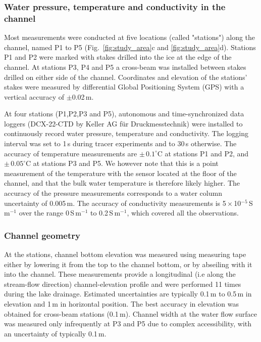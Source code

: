 \subsubsection{Water pressure, temperature and conductivity in the channel}

Most measurements were conducted at five locations (called "stations") along the channel, named P1 to P5 (Fig.~\ref{fig:study_area}c and \ref{fig:study_area}d). Stations P1 and P2 were marked with stakes drilled into the ice at the edge of the channel. At stations P3, P4 and P5 a cross-beam was installed between stakes drilled on either side of the channel.
Coordinates and elevation of the stations' stakes were measured by differential Global Positioning System (GPS) with a vertical accuracy of $\pm$0.02\,m.

At four stations (P1,P2,P3 and P5), autonomous and time-synchronized data loggers (DCX-22-CTD by Keller AG für Druckmesstechnik) were installed to continuously record water pressure, temperature and conductivity. The logging interval was set to 1\,s during tracer experiments and to 30\,s otherwise. The accuracy of temperature measurements are $\pm\,0.1^\circ$C at stations P1 and P2, and $\pm\,0.05^\circ$C at stations P3 and P5. We however note that this is a point measurement of the temperature with the sensor located at the floor of the channel, and that the bulk water temperature is therefore likely higher. The accuracy of the pressure measurements corresponds to a water column uncertainty of 0.005\,m. The accuracy of conductivity measurements is 5\,$\times$\,10$^{-5}$\,S\,m$^{-1}$ over the range 0\,S\,m$^{-1}$ to 0.2\,S\,m$^{-1}$, which covered all the observations.

\subsubsection{Channel geometry}
\label{subsubsection:channel_geometry}

At the stations, channel bottom elevation was measured using measuring tape either by lowering it from the top to the channel bottom, or by abseiling with it into the channel. These measurements provide a longitudinal (i.e along the stream-flow direction) channel-elevation profile and were performed 11 times during the lake drainage. Estimated uncertainties are typically 0.1\,m to 0.5\,m in elevation and 1\,m in horizontal position. The best accuracy in elevation was obtained for cross-beam stations (0.1\,m). Channel width at the water flow surface was measured only infrequently at P3 and P5 due to complex accessibility, with an uncertainty of typically 0.1\,m.

